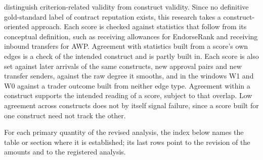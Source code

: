 
\textcite{cronbach1955construct} distinguish criterion-related validity from construct validity. Since no definitive gold-standard label of contract reputation exists, this research takes a construct-oriented approach. Each score is checked against statistics that follow from its conceptual definition, such as receiving allowances for EndorseRank and receiving inbound transfers for AWP. Agreement with statistics built from a score's own edges is a check of the intended construct and is partly built in. Each score is also set against later arrivals of the same constructs, new approval pairs and new transfer senders, against the raw degree it smooths, and in the windows W1 and W0 against a trader outcome built from neither edge type. Agreement within a construct supports the intended reading of a score, subject to that overlap. Low agreement across constructs does not by itself signal failure, since a score built for one construct need not track the other.


For each primary quantity of the revised analysis, the index below names the table or section where it is established; its last rows point to the revision of the amounts and to the registered analysis.

